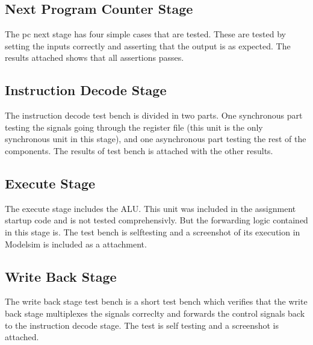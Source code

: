 \subsection{Next Program Counter Stage}
The pc next stage has four simple cases that are tested. These are tested by setting the inputs correctly and asserting that the output is as expected. The results attached shows that all assertions passes.

\subsection{Instruction Decode Stage}
The instruction decode test bench is divided in two parts. One synchronous part testing the signals going through the register file (this unit is the only synchronous unit in this stage), and one asynchronous part testing the rest of the components. The results of test bench is attached with the other results.

\subsection{Execute Stage}

The execute stage includes the ALU. This unit was included in the assignment startup code and is not tested comprehensivly. But the forwarding logic contained in this stage is. The test bench is selftesting and a screenshot of its execution in Modelsim is included as a attachment.

\subsection{Write Back Stage}

The write back stage test bench is a short test bench which verifies that the write back stage multiplexes the signals correclty and forwards the control signals back to the instruction decode stage. The test is self testing and a screenshot is attached.